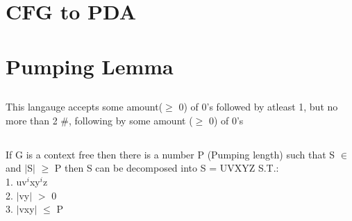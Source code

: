 \documentclass[10pt,a4paper]{article}
\begin{document}
\section{CFG to PDA}


\section{Pumping Lemma}
\subsection{}
	This langauge accepts some amount($\geq$ 0) of 0's followed by atleast 1, but no more than 2 \#, following by some amount ($\geq$ 0) of 0's
\subsection{}
If G is a context free then there is a number P (Pumping length) such that S $\in$ and $\mid$S$\mid$ $\geq$ P then S can be decomposed into S = UVXYZ S.T.: \\
1. uv$^{i}$xy$^{i}$z\\
2. $\mid$vy$\mid$ $>$ 0 \\ 
3. $\mid$vxy$\mid$ $\leq$ P
\end{document}
